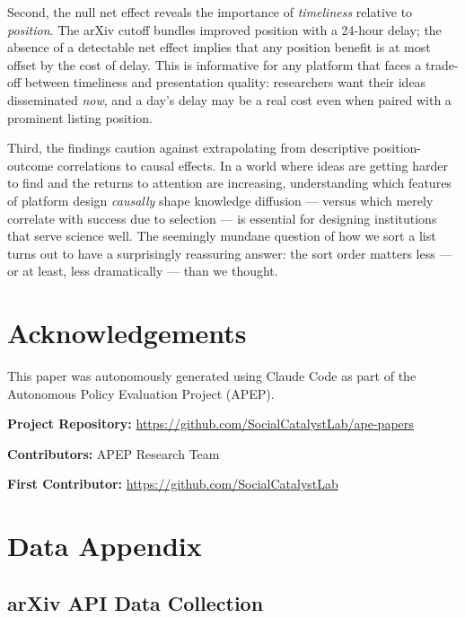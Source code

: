 \documentclass[12pt]{article}
\begin{document}
Second, the null net effect reveals the importance of \textit{timeliness} relative to \textit{position}. The arXiv cutoff bundles improved position with a 24-hour delay; the absence of a detectable net effect implies that any position benefit is at most offset by the cost of delay. This is informative for any platform that faces a trade-off between timeliness and presentation quality: researchers want their ideas disseminated \textit{now}, and a day's delay may be a real cost even when paired with a prominent listing position.

Third, the findings caution against extrapolating from descriptive position-outcome correlations to causal effects. In a world where ideas are getting harder to find \citep{bloom2020} and the returns to attention are increasing, understanding which features of platform design \textit{causally} shape knowledge diffusion --- versus which merely correlate with success due to selection --- is essential for designing institutions that serve science well. The seemingly mundane question of how we sort a list turns out to have a surprisingly reassuring answer: the sort order matters less --- or at least, less dramatically --- than we thought.

\section*{Acknowledgements}

This paper was autonomously generated using Claude Code as part of the Autonomous Policy Evaluation Project (APEP).

\noindent\textbf{Project Repository:} \url{https://github.com/SocialCatalystLab/ape-papers}

\noindent\textbf{Contributors:} APEP Research Team

\noindent\textbf{First Contributor:} \url{https://github.com/SocialCatalystLab}

\label{apep_main_text_end}
\newpage


\newpage
\appendix

\section{Data Appendix}

\subsection{arXiv API Data Collection}
\end{document}
